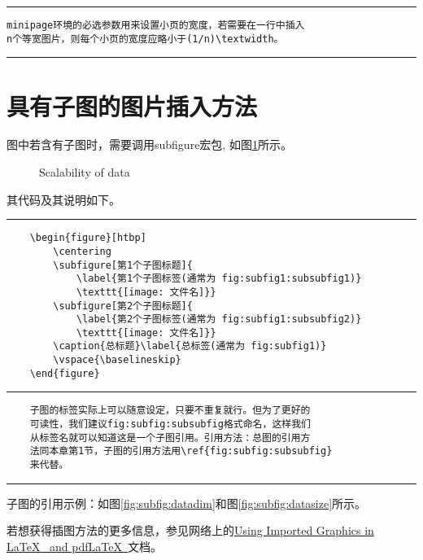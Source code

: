 \noindent\hrule

\begin{verbatim}
minipage环境的必选参数用来设置小页的宽度，若需要在一行中插入
n个等宽图片，则每个小页的宽度应略小于(1/n)\textwidth。
\end{verbatim}

\noindent\hrule

\section{具有子图的图片插入方法}
图中若含有子图时，需要调用subfigure宏包, 如图\ref{fig:subfig}所示。
\begin{figure}[htbp]
	\centering
	\caption{Scalability of data}\label{fig:subfig}
	\vspace{\baselineskip}
\end{figure}

其代码及其说明如下。
\vspace{1em}\noindent\hrule

\begin{verbatim}
	\begin{figure}[htbp]
		\centering
		\subfigure[第1个子图标题]{
			\label{第1个子图标签(通常为 fig:subfig1:subsubfig1)}
			\texttt{[image: 文件名]}}
		\subfigure[第2个子图标题]{
			\label{第2个子图标签(通常为 fig:subfig1:subsubfig2)}
			\texttt{[image: 文件名]}}
		\caption{总标题}\label{总标签(通常为 fig:subfig1)}
		\vspace{\baselineskip}
	\end{figure}
\end{verbatim}

\noindent\hrule

\begin{verbatim}
	子图的标签实际上可以随意设定，只要不重复就行。但为了更好的
	可读性，我们建议fig:subfig:subsubfig格式命名，这样我们
	从标签名就可以知道这是一个子图引用。引用方法：总图的引用方
	法同本章第1节，子图的引用方法用\ref{fig:subfig:subsubfig}
	来代替。
\end{verbatim}

\noindent\hrule\vspace{1em}

子图的引用示例：如图\ref{fig:subfig:datadim}和图\ref{fig:subfig:datasize}所示。

若想获得插图方法的更多信息，参见网络上的\href{ftp://ftp.tex.ac.uk/tex-archive/info/epslatex.pdf}{Using Imported Graphics in \LaTeX~ and pdf\LaTeX~}文档。